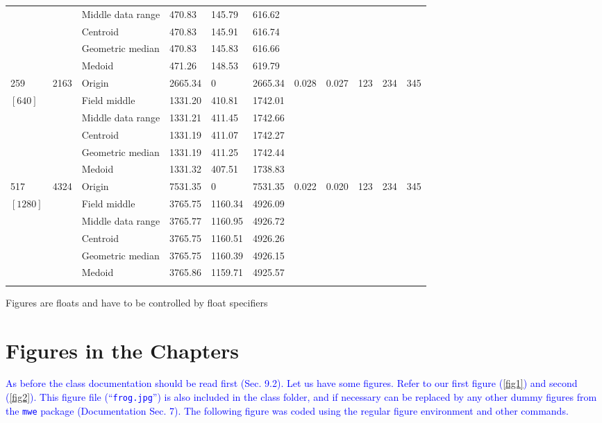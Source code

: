 \documentclass[phd,showgrids]{ndsu-thesis-2022}
\newcommand\italk[1]{\textcolor{blue}{#1}}  %
\begin{document}
\begin{landscape}
{{\begin{ThreePartTable}
\begin{longtable}{lll lll ll rrr}
 &  & Middle data range  & 470.83 & 145.79 & 616.62 \\
 &  & Centroid & 470.83 & 145.91 & 616.74 \\
 &  & Geometric median & 470.83 & 145.83 & 616.66 \\
 &  & Medoid  & 471.26 & 148.53 & 619.79 \\
\midrule
259 & 2163 & Origin  & 2665.34 & 0 & 2665.34 & 0.028 & 0.027 & 123 & 234 & 345 \\
$[640]$ &  & Field middle  & 1331.20 & 410.81 & 1742.01 \\
 &  & Middle data range  & 1331.21 & 411.45 & 1742.66 \\
 &  & Centroid & 1331.19 & 411.07 & 1742.27 \\
 &  & Geometric median & 1331.19 & 411.25 & 1742.44 \\
 &  & Medoid  & 1331.32 & 407.51 & 1738.83 \\
\midrule
517 & 4324 & Origin  & 7531.35 & 0 & 7531.35 & 0.022 & 0.020 & 123 & 234 & 345 \\
$[1280]$ &  & Field middle  & 3765.75 & 1160.34 & 4926.09 \\
 &  & Middle data range  & 3765.77 & 1160.95 & 4926.72 \\
 &  & Centroid & 3765.75 & 1160.51 & 4926.26 \\
 &  & Geometric median & 3765.75 & 1160.39 & 4926.15 \\
 &  & Medoid  & 3765.86 & 1159.71 & 4925.57 \\
\label{longtabls} %
\end{longtable} 
\end{ThreePartTable}
}
}
\end{landscape}

\setlength{\parindent}{0.5in}
\vspace{-2ex}


{Figures are floats and have to be controlled by float specifiers}

\section{Figures in the Chapters}
\italk{As before the class documentation should be read first (Sec. 9.2). Let us have some figures. Refer to our first figure (\cref{fig1}) and second (\cref{fig2}). This figure file (``\texttt{frog.jpg}'') is also included in the class folder, and if necessary can be replaced by any other dummy figures from the \texttt{mwe} package (Documentation Sec. 7). The following figure was coded using the regular figure environment and other commands.}
\end{document}
